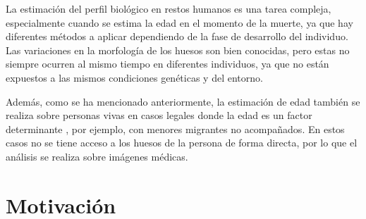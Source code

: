 La estimación del perfil biológico en restos humanos es una tarea compleja, especialmente cuando se estima la edad
en el momento de la muerte, ya que hay diferentes métodos a aplicar dependiendo de la fase de desarrollo del individuo. 
Las variaciones en la morfología de los huesos son bien conocidas, pero estas no siempre ocurren al mismo tiempo en 
diferentes individuos, ya que no están expuestos a las mismos condiciones genéticas y del entorno.

Además, como se ha mencionado anteriormente, la estimación de edad también se realiza sobre personas vivas
en casos legales donde la edad es un factor determinante \cite{schmeling2016}, por ejemplo, con menores migrantes  
no acompañados. En estos casos no se tiene acceso a 
los huesos de la persona de forma directa, por lo que el análisis se realiza sobre imágenes médicas.




\section{Motivación}

